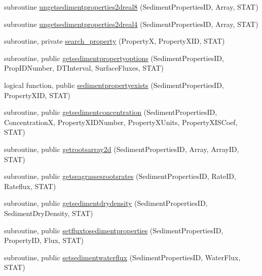 \begin{DoxyCompactItemize}
subroutine \mbox{\hyperlink{namespacemodulesedimentproperties_a1403cdef2dd5dd1114fbe5112f6e064b}{ungetsedimentproperties2dreal8}} (Sediment\+Properties\+ID, Array, S\+T\+AT)
\item 
subroutine \mbox{\hyperlink{namespacemodulesedimentproperties_accb6adda15d2ee5cad20ff3f45586c73}{ungetsedimentproperties2dreal4}} (Sediment\+Properties\+ID, Array, S\+T\+AT)
\item 
subroutine, private \mbox{\hyperlink{namespacemodulesedimentproperties_a30718f70ea81a445eb986292b5c9cd5f}{search\+\_\+property}} (PropertyX, Property\+X\+ID, S\+T\+AT)
\item 
subroutine, public \mbox{\hyperlink{namespacemodulesedimentproperties_a140a456cc243156f2a6bc2d18fc0a834}{getsedimentpropertyoptions}} (Sediment\+Properties\+ID, Prop\+I\+D\+Number, D\+T\+Interval, Surface\+Fluxes, S\+T\+AT)
\item 
logical function, public \mbox{\hyperlink{namespacemodulesedimentproperties_a5b50162eeb042d1b89c4fc2ed2edfa45}{sedimentpropertyexists}} (Sediment\+Properties\+ID, Property\+X\+ID, S\+T\+AT)
\item 
subroutine, public \mbox{\hyperlink{namespacemodulesedimentproperties_adaa8d0935c5e2ecaae01dd156ea881ca}{getsedimentconcentration}} (Sediment\+Properties\+ID, ConcentrationX, Property\+X\+I\+D\+Number, Property\+X\+Units, Property\+X\+I\+S\+Coef, S\+T\+AT)
\item 
subroutine, public \mbox{\hyperlink{namespacemodulesedimentproperties_a36fdb0ce96392baedfac23a2a327bf82}{getrootsarray2d}} (Sediment\+Properties\+ID, Array, Array\+ID, S\+T\+AT)
\item 
subroutine, public \mbox{\hyperlink{namespacemodulesedimentproperties_a42d2292c7a554b05916ee8fcf65066b6}{getseagrassesrootsrates}} (Sediment\+Properties\+ID, Rate\+ID, Rateflux, S\+T\+AT)
\item 
subroutine, public \mbox{\hyperlink{namespacemodulesedimentproperties_ac8feadd6cbbbb852c325a183475aaa8c}{getsedimentdrydensity}} (Sediment\+Properties\+ID, Sediment\+Dry\+Density, S\+T\+AT)
\item 
subroutine, public \mbox{\hyperlink{namespacemodulesedimentproperties_a9049928f5adeb27938b063b548a194af}{setfluxtosedimentproperties}} (Sediment\+Properties\+ID, Property\+ID, Flux, S\+T\+AT)
\item 
subroutine, public \mbox{\hyperlink{namespacemodulesedimentproperties_adc94767ccafe5984e0d36e04b40f9c5a}{setsedimentwaterflux}} (Sediment\+Properties\+ID, Water\+Flux, S\+T\+AT)
\item 

\end{DoxyCompactItemize}
